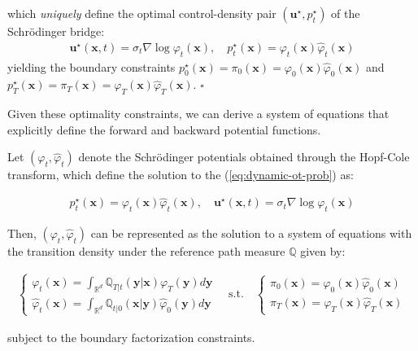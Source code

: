 \documentclass{article}
\begin{document}
which \textit{uniquely} define the optimal control-density pair $(\boldsymbol{u}^\star, p^\star_t)$ of the Schrödinger bridge:
\begin{align}
    \boxed{\boldsymbol{u}^\star(\boldsymbol{x},t)=\sigma_t\nabla\log \varphi_t(\boldsymbol{x}),\quad p^\star_t(\boldsymbol{x})=\varphi_t(\boldsymbol{x})\hat{\varphi}_t(\boldsymbol{x})}\tag{Optimal Control-Density Pair}
\end{align}
yielding the boundary constraints $p_0^\star(\boldsymbol{x})=\pi_0(\boldsymbol{x})= \varphi_0(\boldsymbol{x})\hat\varphi_0(\boldsymbol{x})$ and $p_T^\star(\boldsymbol{x})=\pi_T(\boldsymbol{x})=\varphi_T(\boldsymbol{x}) \hat\varphi_T(\boldsymbol{x})$. \hfill $\square$

Given these optimality constraints, we can derive a system of equations that explicitly define the forward and backward potential functions.

\begin{corollary}\label{corollary:schrodinger-system}
    Let $(\varphi_t, \hat\varphi_t)$ denote the Schrödinger potentials obtained through the Hopf-Cole transform, which define the solution to the (\ref{eq:dynamic-ot-prob}) as:
    \begin{small}
    \begin{align}
        p_t^\star(\boldsymbol{x})=\varphi_t(\boldsymbol{x})\hat\varphi_t(\boldsymbol{x}), \quad \boldsymbol{u}^\star(\boldsymbol{x},t)=\sigma_t\nabla\log \varphi_t(\boldsymbol{x})
    \end{align}
    \end{small}
    Then, $(\varphi_t, \hat\varphi_t)$ can be represented as the solution to a system of equations with the transition density under the reference path measure $\mathbb{Q}$ given by:
    \begin{small}
    \begin{align}
        \begin{cases}
        \varphi_t(\boldsymbol{x})=\int_{\mathbb{R}^d}\mathbb{Q}_{T|t}(\boldsymbol{y}|\boldsymbol{x})\varphi_T(\boldsymbol{y})d\boldsymbol{y}\\
        \hat{\varphi}_t(\boldsymbol{x})=\int_{\mathbb{R}^d}\mathbb{Q}_{t|0}(\boldsymbol{x}|\boldsymbol{y})\hat{\varphi}_0(\boldsymbol{y})d\boldsymbol{y}
    \end{cases}\quad\text{s.t.}\quad
    \begin{cases}
        \pi_0(\boldsymbol{x})=\varphi_0(\boldsymbol{x})\hat{\varphi}_0(\boldsymbol{x})\\
        \pi_T(\boldsymbol{x})=\varphi_T(\boldsymbol{x})\hat{\varphi}_T(\boldsymbol{x})
    \end{cases}\tag{Schrödinger Potentials}\label{eq:proof-sb-system}
    \end{align}
    \end{small}
    subject to the boundary factorization constraints. 
\end{corollary}
\end{document}

